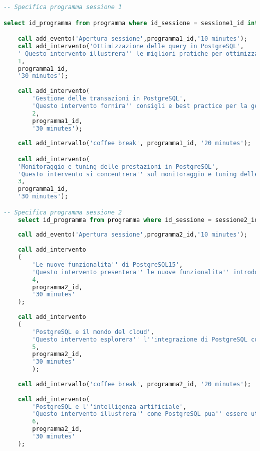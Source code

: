 \begin{lstlisting}[language=SQL, style=mystyle,caption={Conferenza PGConf NPL}]
-- Specifica programma sessione 1

select id_programma from programma where id_sessione = sessione1_id into programma1_id;

	call add_evento('Apertura sessione',programma1_id,'10 minutes');
	call add_intervento('Ottimizzazione delle query in PostgreSQL',
	' Questo intervento illustrera'' le migliori pratiche per ottimizzare le query in PostgreSQL, inclusi suggerimenti per la scrittura di query efficienti e l''utilizzo degli indici corretti.',
	1,
	programma1_id,
	'30 minutes');
	
	call add_intervento(
	    'Gestione delle transazioni in PostgreSQL',
	    'Questo intervento fornira'' consigli e best practice per la gestione delle transazioni in PostgreSQL, comprese le strategie di commit e rollback, il controllo della concorrenza e l''utilizzo di blocchi di transazioni.',
	    2,
	    programma1_id,
	    '30 minutes');
	    
	call add_intervallo('coffee break', programma1_id, '20 minutes');

	call add_intervento(
	'Monitoraggio e tuning delle prestazioni in PostgreSQL',
	'Questo intervento si concentrera'' sul monitoraggio e tuning delle prestazioni in PostgreSQL, presentando strumenti e tecniche per l''identificazione e risoluzione dei problemi di performance.',
	3,
	programma1_id,
	'30 minutes');

-- Specifica programma sessione 2
	select id_programma from programma where id_sessione = sessione2_id into programma2_id;
	
	call add_evento('Apertura sessione',programma2_id,'10 minutes');
	
	call add_intervento
	(
	    'Le nuove funzionalita'' di PostgreSQL15',
	    'Questo intervento presentera'' le nuove funzionalita'' introdotte nella versione 14 di PostgreSQL e come queste possono influenzare il futuro dello sviluppo e dell''utilizzo del database.',
	    4,
	    programma2_id,
	    '30 minutes'
	);
	    
	call add_intervento
	(
	    'PostgreSQL e il mondo del cloud',
	    'Questo intervento esplorera'' l''integrazione di PostgreSQL con le piattaforme di cloud computing e le implicazioni di questa evoluzione per le applicazioni e l''adozione del database nel futuro.',
	    5,
	    programma2_id,
	    '30 minutes'
	    );
	    
	call add_intervallo('coffee break', programma2_id, '20 minutes');
	
	call add_intervento(
	    'PostgreSQL e l''intelligenza artificiale',
	    'Questo intervento illustrera'' come PostgreSQL pua'' essere utilizzato nell''ambito dell''intelligenza artificiale, compresi casi d''uso, funzionalita'' e best practice per l''integrazione di PostgreSQL con strumenti e librerie di AI.',
	    6,
	    programma2_id,
	    '30 minutes'
	);
	    

\end{lstlisting}
